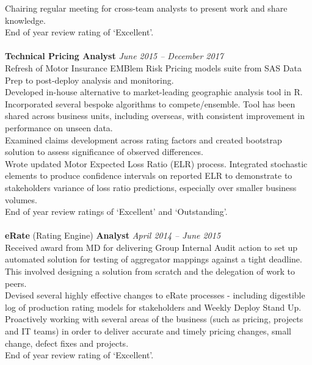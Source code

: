 \documentclass[11pt]{article}
\begin{document}
\begin{description}
\textbullet \quad Chairing regular meeting for cross-team analysts to present work and share knowledge. \\
\textbullet \quad End of year review rating of `Excellent'.
\\\\
\textbf{Technical Pricing Analyst} \emph{June 2015 -- December 2017}\\
\textbullet \quad Refresh of Motor Insurance EMBlem Risk Pricing models suite from SAS Data Prep to post-deploy analysis and monitoring. \\
\textbullet \quad Developed in-house alternative to market-leading geographic analysis tool in R. Incorporated several bespoke algorithms to compete/ensemble. Tool has been shared across business units, including overseas, with consistent improvement in performance on unseen data. \\
\textbullet \quad Examined claims development across rating factors and created bootstrap solution to assess significance of observed differences. \\
\textbullet \quad Wrote updated Motor Expected Loss Ratio (ELR) process. Integrated stochastic elements to produce confidence intervals on reported ELR to demonstrate to stakeholders variance of loss ratio predictions, especially over smaller business volumes. \\
\textbullet \quad End of year review ratings of `Excellent' and `Outstanding'.
\\\\
\newpage
\textbf{eRate} (Rating Engine) \textbf{Analyst} \emph{April 2014 -- June 2015}\\
\textbullet \quad Received award from MD for delivering Group Internal Audit action to set up automated solution for testing of aggregator mappings against a tight deadline. This involved designing a solution from scratch and the delegation of work to peers.\\
\textbullet \quad Devised several highly effective changes to eRate processes - including digestible log of production rating models for stakeholders and Weekly Deploy Stand Up. \\
\textbullet \quad Proactively working with several areas of the business (such as pricing, projects and IT teams) in order to deliver accurate and timely pricing changes, small change, defect fixes and projects.\\
\textbullet \quad End of year review rating of `Excellent'.



\end{description}
\end{document}

